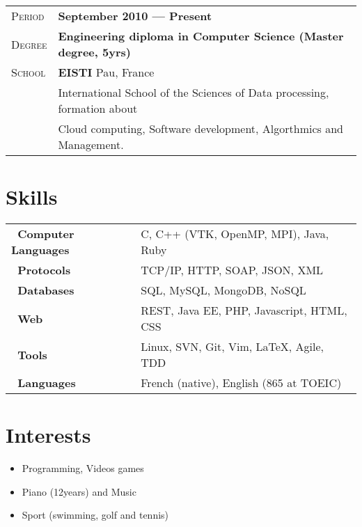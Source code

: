 \documentclass[a4paper, oneside, final]{scrartcl} %
\newcommand{\gray}{\rowcolor[gray]{.90}} %
\begin{document}
\begin{center}
\begin{tabularx}{1\linewidth}{>{\raggedleft\scshape}p{2cm}X}
  \gray Period & \textbf{September 2010 --- Present}\\
    \gray Degree & \textbf{Engineering diploma in Computer Science (Master degree, 5yrs)}\\
  \gray School & \textbf{EISTI} \hfill Pau, France\\
  & International School of the Sciences of Data processing, formation about\\
  & Cloud computing, Software development, Algorthmics and Management.
\end{tabularx}


\section{Skills}

\begin{tabular}{ @{} >{\bfseries}l @{\hspace{4ex}} l }
  ~Computer Languages & C, C++ (VTK, OpenMP, MPI), Java, Ruby \\
  ~Protocols          & TCP/IP, HTTP, SOAP, JSON, XML\\
  ~Databases          & SQL, MySQL, MongoDB, NoSQL \\
  ~Web                & REST, Java EE, PHP, Javascript, HTML, CSS \\
  ~Tools              & Linux, SVN, Git, Vim,  \LaTeX, Agile, TDD\\
  ~Languages          & French (native), English (865 at TOEIC)
\end{tabular}




\section{Interests}

\begin{itemize}[noitemsep,topsep=0pt,parsep=0pt,partopsep=0pt]
 \setlength{\itemsep}{1pt}
 \item Programming, Videos games
 \item Piano (12years) and Music
 \item Sport (swimming, golf and tennis)
\end{itemize}


\end{center}
\end{document}
